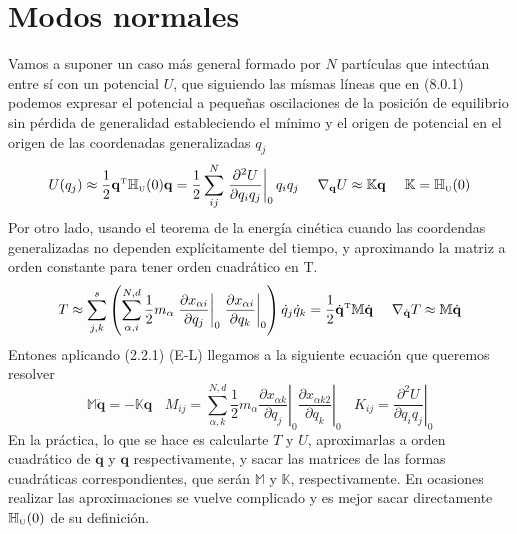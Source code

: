 \chapter{Modos normales}
Vamos a suponer un caso más general formado por $N$ partículas que intectúan entre sí con un potencial $U$, que siguiendo las mísmas líneas que en (8.0.1) podemos expresar el potencial a pequeñas oscilaciones de la posición de equilibrio sin pérdida de generalidad estableciendo el mínimo y el origen de potencial en el origen de las coordenadas generalizadas $q_j$
\begin{equation} \label{6.1.1}
    U({q_j}) \approx \frac{1}{2}\mathbf{q}^{\mbox{\tiny T}} \mathbb{H}_{\mbox{\tiny U}}(0)\mathbf{q} = \frac{1}{2} \sum_{ij}^N \left.\frac{\partial^2 U}{\partial q_i q_j}\right|_0 q_i q_j \ \ \ \ \nabla_{\mathbf{q}} U \approx \mathbb{K} \mathbf{q} \ \ \ \ \mathbb{K} = \mathbb{H}_{\mbox{\tiny U}}(0)
\end{equation}
Por otro lado, usando el teorema de la energía cinética cuando las coordendas generalizadas no dependen explícitamente del tiempo, y aproximando la matriz a orden constante para tener orden cuadrático en T.
\begin{equation} \label{6.1.1}
     T \approx \sum_{j,k}^s{\left(\sum_{\alpha,i}^{N,d} \frac{1}{2} m_\alpha \left.\frac{\partial x_{\alpha i}}{\partial q_j}\right|_0\left.\frac{\partial x_{\alpha i}}{\partial q_k}\right|_0\right)\dot{q}_j\dot{q}_k} = \frac{1}{2}\dot{\mathbf{q}}^{\mbox{\tiny T}} \mathbb{M}\dot{\mathbf{q}} \ \ \ \ \nabla_{\dot{\mathbf{q}}} T \approx \mathbb{M}\dot{\mathbf{q}}
\end{equation}
Entones aplicando (2.2.1) (E-L) llegamos a la siguiente ecuación que queremos resolver
\begin{equation} \label{6.1.1}
    \mathbb{M}\ddot{\mathbf{q}} = - \mathbb{K} \mathbf{q} \ \ \ \ M_{ij} = \sum_{\alpha,k}^{N,d} \frac{1}{2} m_\alpha \left.\frac{\partial x_{\alpha k}}{\partial q_j}\right|_0\left.\frac{\partial x_{\alpha k2}}{\partial q_k}\right|_0 \ \ \ \ K_{ij} = \left.\frac{\partial^2 U}{\partial q_i q_j}\right|_0
\end{equation}
En la práctica, lo que se hace es calcularte $T$ y $U$, aproximarlas a orden cuadrático de $\dot{\mathbf{q}}$ y $\mathbf{q}$ respectivamente, y sacar las matrices de las formas cuadráticas correspondientes, que serán $\mathbb{M}$ y $\mathbb{K}$, respectivamente. En ocasiones realizar las aproximaciones se vuelve complicado y es mejor sacar directamente $\mathbb{H}_{\mbox{\tiny U}}(0)$ de su definición.

